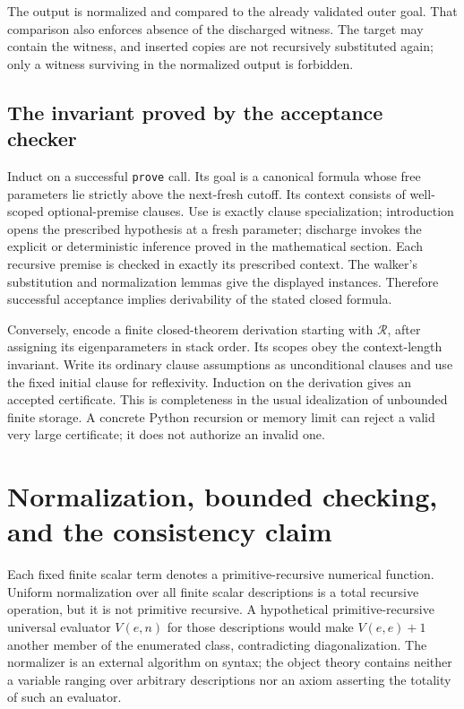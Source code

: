 \documentclass[11pt,letterpaper]{article}
\theoremstyle{definition}\newtheorem{definition}[theorem]{Definition}
\theoremstyle{remark}\newtheorem{remark}[theorem]{Remark}
\begin{document}
The output is normalized and compared to the already validated outer goal.
That comparison also enforces absence of the discharged witness. The target
may contain the witness, and inserted copies are not recursively substituted
again; only a witness surviving in the normalized output is forbidden.

\subsection{The invariant proved by the acceptance checker}

Induct on a successful \texttt{prove} call. Its goal is a canonical formula
whose free parameters lie strictly above the next-fresh cutoff. Its context
consists of well-scoped optional-premise clauses. Use is exactly clause
specialization; introduction opens the prescribed hypothesis at a fresh
parameter; discharge invokes the explicit or deterministic inference proved
in the mathematical section. Each recursive premise is checked in exactly
its prescribed context. The walker's substitution and normalization lemmas
give the displayed instances. Therefore successful acceptance implies
derivability of the stated closed formula.

Conversely, encode a finite closed-theorem derivation starting with
$\mathcal R$, after assigning its eigenparameters
in stack order. Its scopes obey the context-length invariant. Write its
ordinary clause assumptions as unconditional clauses and use the fixed
initial clause for reflexivity. Induction on the derivation gives an accepted
certificate. This is completeness in the usual idealization of unbounded
finite storage. A concrete Python recursion or memory limit can reject a
valid very large certificate; it does not authorize an invalid one.

\section{Normalization, bounded checking, and the consistency claim}
\label{sec:bounded}

Each fixed finite scalar term denotes a primitive-recursive numerical
function. Uniform normalization over all finite scalar descriptions is a
total recursive operation, but it is not primitive recursive. A hypothetical
primitive-recursive universal evaluator $V(e,n)$ for those descriptions
would make $V(e,e)+1$ another member of the enumerated class, contradicting
diagonalization. The normalizer is an external algorithm on syntax; the
object theory contains neither a variable ranging over arbitrary descriptions
nor an axiom asserting the totality of such an evaluator.
\end{document}
